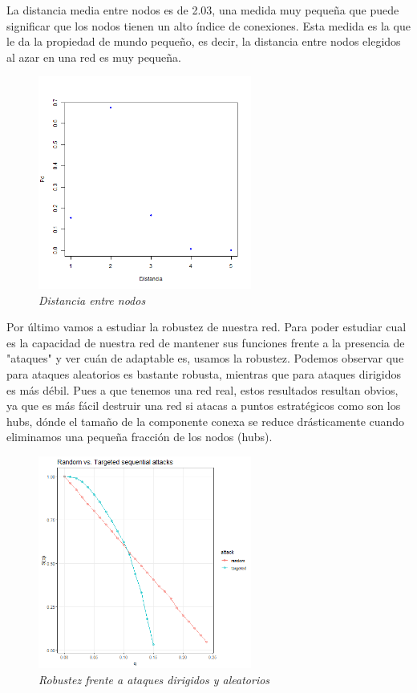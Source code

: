 La distancia media entre nodos es de 2.03, una medida muy pequeña que puede significar que los nodos tienen un alto índice de conexiones. Esta medida es la que le da la propiedad de mundo pequeño, es decir, la distancia entre nodos elegidos al azar en una red es muy pequeña. 
\begin{figure}
	\centering
	
	\includegraphics[width=70mm,scale=1.2]{figures/distancia.png}
	
	\caption{\textit{Distancia entre nodos}}
	
\end{figure}

Por último vamos a estudiar la robustez de nuestra red. Para poder estudiar cual es la capacidad de nuestra red de mantener sus funciones frente a la presencia de "ataques" y ver cuán de adaptable es, usamos la robustez. Podemos observar que para ataques aleatorios es bastante robusta, mientras que para ataques dirigidos es más débil. Pues a que tenemos una red real, estos resultados resultan obvios, ya que es más fácil destruir una red si atacas a puntos estratégicos como son los hubs, dónde el tamaño de la componente conexa se reduce drásticamente cuando eliminamos una pequeña fracción de los nodos (hubs). 

\begin{figure}
	\centering
	\includegraphics[width=70mm,scale=1.2]{figures/sequential_attacks.png}
	\caption{\textit{Robustez frente a ataques dirigidos y aleatorios}}
\end{figure}


